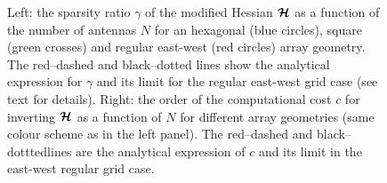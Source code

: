 \documentclass[useAMS,usenatbib]{mn2e}
\newcommand{\bmH}{\bmath{\mathcal{H}}}
\begin{document}
\begin{figure}
\centering
{}
\caption{Left: the sparsity ratio $\gamma$ of the modified Hessian $\bmH$ as a function of the number of antennas $N$ for an hexagonal (blue circles), square (green crosses) and regular east-west (red circles) array geometry. The red--dashed and black--dotted lines show the analytical expression for $\gamma$ and its limit for the regular east-west grid case (see text for details). Right: the order of the computational cost $c$ for inverting $\bmH$ as a function of $N$ for different array geometries (same colour scheme as in the left panel). The red--dashed and black--dotttedlines are the analytical expression of $c$ and its limit in the east-west regular grid case.
\label{fig:sparsity}} 
\end{figure}
\end{document}
